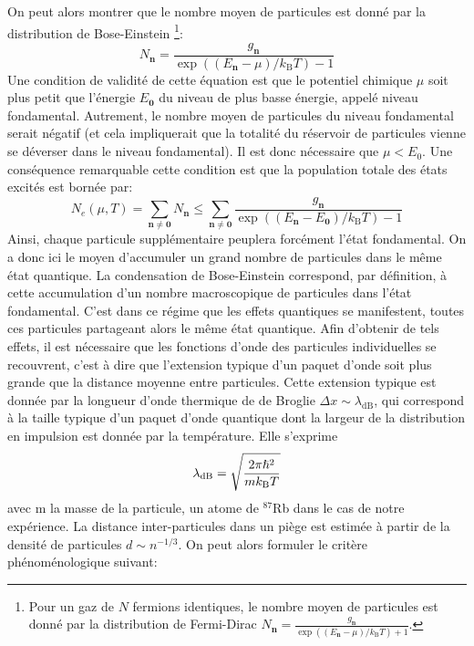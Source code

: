 On peut alors montrer que le nombre moyen de particules est donné par la distribution de Bose-Einstein \footnote{Pour un gaz de $N$ fermions identiques, le nombre moyen de particules est donné par la distribution de Fermi-Dirac $ N_{\mathbf{n}}=\frac{g_{\mathbf{n}}}{\exp{\left( (E_{\mathbf{n}}-\mu)/k_{\mathrm{B}}T\right)}+1}$.}:\citep{diu1989elements}
\begin{equation}
N_{\mathbf{n}}=\frac{g_{\mathbf{n}}}{\exp{\left( (E_{\mathbf{n}}-\mu)/k_{\mathrm{B}}T \right)}-1}
\end{equation}
Une condition de validité de cette équation est que le potentiel chimique $\mu$ soit plus petit que l'énergie $E_{\mathbf{0}}$ du niveau de plus basse énergie, appelé niveau fondamental. Autrement, le nombre moyen de particules du niveau fondamental serait négatif (et cela impliquerait que la totalité du réservoir de particules vienne se déverser dans le niveau fondamental). Il est donc nécessaire que $\mu < E_0$. Une conséquence remarquable cette condition est que la population totale des états excités est bornée par:
\begin{equation}
N_e(\mu,T)=\sum_{\mathbf{n}\neq\mathbf{0}} N_{\mathbf{n}} \leq \sum_{\mathbf{n} \neq \mathbf{0}} \frac{g_{\mathbf{n}}}{\exp{\left( (E_{\mathbf{n}}-E_{\mathbf{0}})/k_{\mathrm{B}}T \right)}-1}
\end{equation}
Ainsi, chaque particule supplémentaire peuplera forcément l'état fondamental. On a donc ici le moyen d'accumuler un grand nombre de particules dans le même état quantique. La condensation de Bose-Einstein correspond, par définition, à cette accumulation d'un nombre macroscopique de particules dans l'état fondamental. C'est dans ce régime que les effets quantiques se manifestent, toutes ces particules partageant alors le même état quantique. Afin d'obtenir de tels effets, il est nécessaire que les fonctions d'onde des particules individuelles se recouvrent, c'est à dire que l'extension typique d'un paquet d'onde soit plus grande que la distance moyenne entre particules. Cette extension typique est donnée par la longueur d'onde thermique de de Broglie $\Delta x \sim \lambda_{\mathrm{dB}}$, qui correspond à la taille typique d'un paquet d'onde quantique dont la largeur de la distribution en impulsion est donnée par la température. Elle s'exprime \citep{diu1989elements}
\begin{equation}
\lambda_{\mathrm{dB}}=\sqrt{\frac{2\pi \hslash^2}{m k_{\mathrm{B}}T}}
\end{equation}
avec m la masse de la particule, un atome de ${}^{87}$Rb dans le cas de notre expérience. La distance inter-particules dans un piège est estimée à partir de la densité de particules $d \sim n^{-1/3}$. On peut alors formuler le critère phénoménologique suivant:
